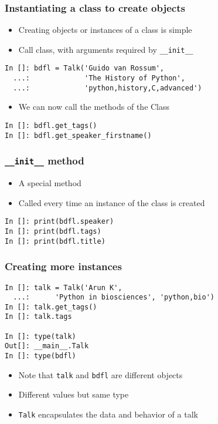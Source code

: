\documentclass[14pt,compress,aspectratio=169]{beamer}
\begin{document}
\begin{frame}[fragile]
  \frametitle{Instantiating a class to create objects}
  \begin{itemize}
  \item Creating objects or instances of a class is simple
  \item Call class, with arguments required by \lstinline{__init__}
  \end{itemize}
  \begin{lstlisting}
In []: bdfl = Talk('Guido van Rossum',
  ...:             'The History of Python',
  ...:             'python,history,C,advanced')
  \end{lstlisting}
  \begin{itemize}
  \item We can now call the methods of the Class
  \end{itemize}
  \begin{lstlisting}
In []: bdfl.get_tags()
In []: bdfl.get_speaker_firstname()
  \end{lstlisting}
\end{frame}

\begin{frame}[fragile]
  \frametitle{\lstinline{__init__} method}
  \begin{itemize}
  \item A special method
  \item Called every time an instance of the class is created
  \end{itemize}
  \begin{lstlisting}
In []: print(bdfl.speaker)
In []: print(bdfl.tags)
In []: print(bdfl.title)
  \end{lstlisting}
\end{frame}

\begin{frame}[fragile]
  \frametitle{Creating more instances}
  \begin{lstlisting}
In []: talk = Talk('Arun K',
  ...:      'Python in biosciences', 'python,bio')
In []: talk.get_tags()
In []: talk.tags

In []: type(talk)
Out[]: __main__.Talk
In []: type(bdfl)
\end{lstlisting}
\begin{itemize}
\item Note that \lstinline{talk} and \lstinline{bdfl} are different objects
\item Different values but same type
\item \lstinline{Talk} \alert{encapsulates} the data and behavior of a talk
\end{itemize}
\end{frame}
\end{document}
